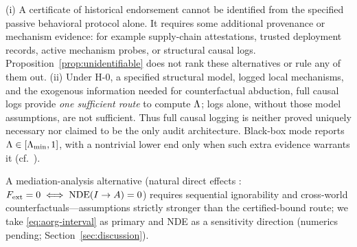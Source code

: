 \begin{corollary}\label{cor:logs-necessary}
(i) A certificate of historical endorsement cannot be identified from the
specified passive behavioral protocol alone. It requires some additional
provenance or mechanism evidence: for example supply-chain attestations,
trusted deployment records, active mechanism probes, or structural causal
logs. Proposition~\ref{prop:unidentifiable} does not rank these alternatives
or rule any of them out. (ii) Under H-0, a specified structural model,
logged local mechanisms, and the exogenous information needed for
counterfactual abduction, full causal logs provide \emph{one sufficient
route} to compute $\Lambda$; logs alone, without those model assumptions, are
not sufficient. Thus full causal logging is neither proved uniquely
necessary nor claimed to be the only audit architecture. Black-box mode
reports $\Lambda\in[\Lambda_{\min},1]$, with a nontrivial lower end only when such
extra evidence warrants it (cf.\ \citealp{capability_permission2026}).
\end{corollary}

A mediation-analysis alternative (natural direct effects
\citep{pearl2001}: $F_{\mathrm{ext}}=0\iff\mathrm{NDE}(I\to A)=0$) requires sequential
ignorability \citep{vanderweele2015} and cross-world
counterfactuals---assumptions strictly stronger than the certified-bound
route; we take \eqref{eq:aorg-interval} as primary and NDE as a sensitivity
direction (numerics pending; Section~\ref{sec:discussion}).
